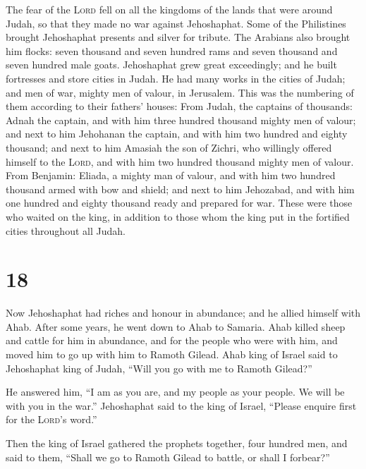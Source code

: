  The fear of the \textsc{Lord} fell on all the kingdoms
of the lands that were around Judah, so that they made no war against
Jehoshaphat.  Some of the Philistines brought Jehoshaphat
presents and silver for tribute. The Arabians also brought him flocks:
seven thousand and seven hundred rams and seven thousand and seven
hundred male goats.  Jehoshaphat grew great exceedingly;
and he built fortresses and store cities in Judah.  He
had many works in the cities of Judah; and men of war, mighty men of
valour, in Jerusalem.  This was the numbering of them
according to their fathers' houses: From Judah, the captains of
thousands: Adnah the captain, and with him three hundred thousand mighty
men of valour;  and next to him Jehohanan the captain,
and with him two hundred and eighty thousand;  and next
to him Amasiah the son of Zichri, who willingly offered himself to the
\textsc{Lord}, and with him two hundred thousand mighty men of valour.
 From Benjamin: Eliada, a mighty man of valour, and with
him two hundred thousand armed with bow and shield;  and
next to him Jehozabad, and with him one hundred and eighty thousand
ready and prepared for war.  These were those who waited
on the king, in addition to those whom the king put in the fortified
cities throughout all Judah.

\hypertarget{section-17}{%
\section{18}\label{section-17}}

 Now Jehoshaphat had riches and honour in abundance; and
he allied himself with Ahab.  After some years, he went
down to Ahab to Samaria. Ahab killed sheep and cattle for him in
abundance, and for the people who were with him, and moved him to go up
with him to Ramoth Gilead.  Ahab king of Israel said to
Jehoshaphat king of Judah, ``Will you go with me to Ramoth Gilead?''

He answered him, ``I am as you are, and my people as your people. We
will be with you in the war.''  Jehoshaphat said to the
king of Israel, ``Please enquire first for the \textsc{Lord}'s word.''

 Then the king of Israel gathered the prophets together,
four hundred men, and said to them, ``Shall we go to Ramoth Gilead to
battle, or shall I forbear?''

